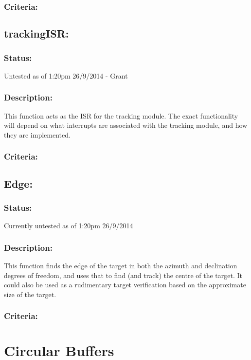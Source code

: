 \documentclass[]{report}
\begin{document}
\subsubsection{Criteria:}

\subsection{trackingISR:}
\subsubsection{Status:}
Untested as of 1:20pm 26/9/2014 - Grant

\subsubsection{Description:}
This function acts as the ISR for the tracking module. The exact functionality will depend on what interrupts are associated with the tracking module, and how they are implemented.

\subsubsection{Criteria:}


\subsection{Edge:}
\subsubsection{Status:}
Currently untested as of 1:20pm 26/9/2014

\subsubsection{Description:}
This function finds the edge of the target in both the azimuth and declination degrees of freedom, and uses that to find (and track) the centre of the target. It could also be used as a rudimentary target verification based on the approximate size of the target.

\subsubsection{Criteria:}

\newpage
\section{Circular Buffers}
\end{document}
